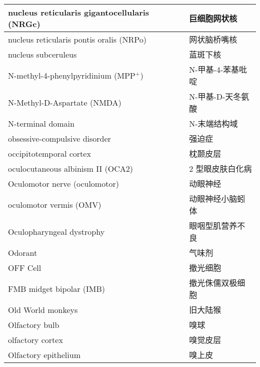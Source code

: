 \begin{longtable}{lll}
	\midrule
	nucleus reticularis gigantocellularis (NRGc)   && 巨细胞网状核  \\
	
	\midrule
	nucleus reticularis pontis oralis (NRPo)   && 网状脑桥嘴核  \\
	
	\midrule
	nucleus subceruleus   && 蓝斑下核  \\
	
	\midrule
	N-methyl-4-phenylpyridinium (MPP$^+$)  && N-甲基-4-苯基吡啶  \\
	
	\midrule
	N-Methyl-D-Aspartate (NMDA)   && N-甲基-D-天冬氨酸  \\
	
	\midrule
	N-terminal domain   && N-末端结构域  \\
	
	\midrule
	obsessive-compulsive disorder     && 强迫症   \\
	
	\midrule
	occipitotemporal cortex     && 枕颞皮层   \\
	
	\midrule
	oculocutaneous albinism II (OCA2)     && 2 型眼皮肤白化病   \\
	
	\midrule
	Oculomotor nerve (oculomotor)     && 动眼神经   \\
	
	\midrule
	oculomotor vermis (OMV)     && 动眼神经小脑蚓体   \\
	
	\midrule
	Oculopharyngeal dystrophy     && 眼咽型肌营养不良   \\
	
	\midrule
	Odorant     && 气味剂   \\
	
	\midrule
	OFF Cell     && 撤光细胞   \\
	
	\midrule
	FMB midget bipolar (IMB)   && 撤光侏儒双极细胞   \\
	
	\midrule
	Old World monkeys     && 旧大陆猴   \\
	
	\midrule
	Olfactory bulb     && 嗅球   \\
	
	\midrule
	olfactory cortex     && 嗅觉皮层   \\
	
	\midrule
	Olfactory epithelium     && 嗅上皮   \\
	

\end{longtable}
